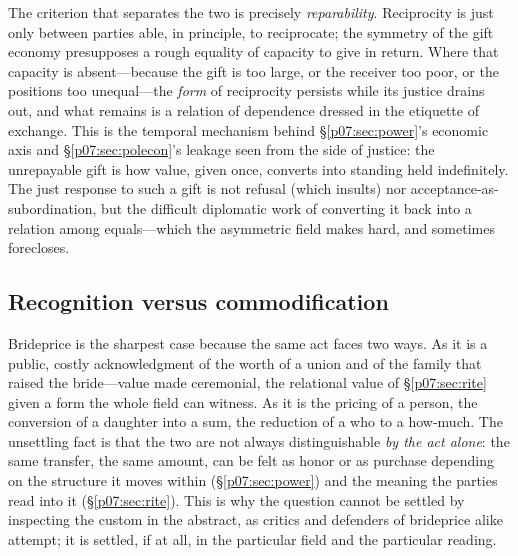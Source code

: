 \documentclass[11pt,a4paper]{article}
\newcommand{\emb}[1]{\textcolor{rose}{\oldtextbf{#1}}}
\newcommand{\xref}[1]{\textcolor{rose}{\S\ref{#1}}}
\begin{document}
The criterion that separates the two is precisely \emph{reparability}. Reciprocity is just only between parties able, in principle, to reciprocate; the symmetry of the gift economy presupposes a rough equality of capacity to give in return. Where that capacity is absent---because the gift is too large, or the receiver too poor, or the positions too unequal---the \emph{form} of reciprocity persists while its justice drains out, and what remains is a relation of dependence dressed in the etiquette of exchange. This is the temporal mechanism behind \xref{p07:sec:power}'s economic axis and \xref{p07:sec:polecon}'s leakage seen from the side of justice: the unrepayable gift is how value, given once, converts into standing held indefinitely. The just response to such a gift is not refusal (which insults) nor acceptance-as-subordination, but the difficult diplomatic work of converting it back into a relation among equals---which the asymmetric field makes hard, and sometimes forecloses.

\subsection{Recognition versus commodification}
Brideprice is the sharpest case because the same act faces two ways. As \emb{recognition} it is a public, costly acknowledgment of the worth of a union and of the family that raised the bride---value made ceremonial, the relational value of \xref{p07:sec:rite} given a form the whole field can witness. As \emb{commodification} it is the pricing of a person, the conversion of a daughter into a sum, the reduction of a who to a how-much. The unsettling fact is that the two are not always distinguishable \emph{by the act alone}: the same transfer, the same amount, can be felt as honor or as purchase depending on the structure it moves within (\xref{p07:sec:power}) and the meaning the parties read into it (\xref{p07:sec:rite}). This is why the question cannot be settled by inspecting the custom in the abstract, as critics and defenders of brideprice alike attempt; it is settled, if at all, in the particular field and the particular reading.
\end{document}
